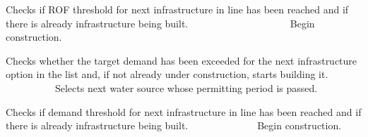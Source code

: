 Checks if R\+OF threshold for next infrastructure in line has been reached and if there is already infrastructure being built. ~\newline
~\newline
~\newline
~\newline
~\newline
~\newline
~\newline
~\newline
~\newline
~\newline
~\newline
~\newline
 Begin construction.

Checks whether the target demand has been exceeded for the next infrastructure option in the list and, if not already under construction, starts building it. ~\newline
~\newline
~\newline
~\newline
~\newline
~\newline
~\newline
~\newline
~\newline
~\newline
 Selects next water source whose permitting period is passed.

Checks if demand threshold for next infrastructure in line has been reached and if there is already infrastructure being built. ~\newline
~\newline
~\newline
~\newline
~\newline
~\newline
~\newline
~\newline
 Begin construction.

